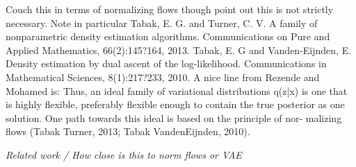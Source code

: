 \documentclass{article}
\begin{document}
 Couch this in terms of normalizing flows though point out this is not strictly necessary.     Note in particular 
 Tabak, E. G. and Turner, C. V. A family of nonparametric density estimation algorithms. Communications on Pure and Applied Mathematics, 66(2):145?164, 2013.
Tabak, E. G and Vanden-Eijnden, E. Density estimation by dual ascent of the log-likelihood. Communications in Mathematical Sciences, 8(1):217?233, 2010.
  A nice line from Rezende and Mohamed is: Thus, an ideal family of variational distributions q(z|x) is one that is highly flexible, preferably flexible enough to contain the true posterior as one solution. One path towards this ideal is based on the principle of nor- malizing flows (Tabak Turner, 2013; Tabak VandenEijnden, 2010).
 
\emph{Related work / How close is this to norm flows or VAE}
\end{document}
